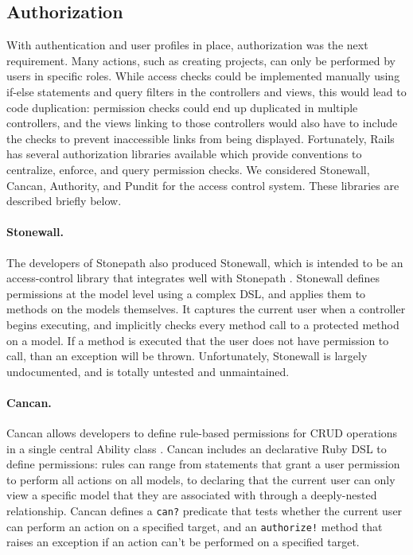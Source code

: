 \documentclass[document.tex]{subfiles}
\begin{document}
\FloatBarrier

\subsection{Authorization}

With authentication and user profiles in place, authorization was the next requirement. Many actions, such as creating projects, can only be performed by users in specific roles. While access checks could be implemented manually using if-else statements and query filters in the controllers and views, this would lead to code duplication: permission checks could end up duplicated in multiple controllers, and the views linking to those controllers would also have to include the checks to prevent inaccessible links from being displayed. Fortunately, Rails has several authorization libraries available which provide conventions to centralize, enforce, and query permission checks. We considered Stonewall, Cancan, Authority, and Pundit for the access control system. These libraries are described briefly below.

\paragraph{Stonewall.} The developers of Stonepath also produced Stonewall, which is intended to be an access-control library that integrates well with Stonepath \cite{stonewall}. Stonewall defines permissions at the model level using a complex DSL, and applies them to methods on the models themselves. It captures the current user when a controller begins executing, and implicitly checks every method call to a protected method on a model. If a method is executed that the user does not have permission to call, than an exception will be thrown. Unfortunately, Stonewall is largely undocumented, and is totally untested and unmaintained.

\paragraph{Cancan.} Cancan allows developers to define rule-based permissions for CRUD operations in a single central Ability class \cite{cancan}. Cancan includes an declarative Ruby DSL to define permissions: rules can range from statements that grant a user permission to perform all actions on all models, to declaring that the current user can only view a specific model that they are associated with through a deeply-nested relationship. Cancan defines a \verb!can?! predicate that tests whether the current user can perform an action on a specified target, and an \verb|authorize!| method that raises an exception if an action can’t be performed on a specified target.
\end{document}
